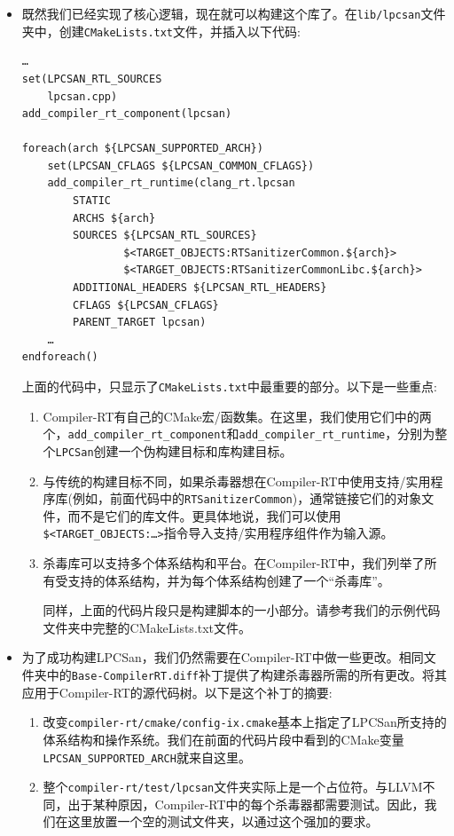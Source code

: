 \begin{itemize}
\item 既然我们已经实现了核心逻辑，现在就可以构建这个库了。在\texttt{lib/lpcsan}文件夹中，创建\texttt{CMakeLists.txt}文件，并插入以下代码:

\begin{lstlisting}[style=styleCMake]
…
set(LPCSAN_RTL_SOURCES
	lpcsan.cpp)
add_compiler_rt_component(lpcsan)

foreach(arch ${LPCSAN_SUPPORTED_ARCH})
	set(LPCSAN_CFLAGS ${LPCSAN_COMMON_CFLAGS})
	add_compiler_rt_runtime(clang_rt.lpcsan
		STATIC
		ARCHS ${arch}
		SOURCES ${LPCSAN_RTL_SOURCES}
				$<TARGET_OBJECTS:RTSanitizerCommon.${arch}>
				$<TARGET_OBJECTS:RTSanitizerCommonLibc.${arch}>
		ADDITIONAL_HEADERS ${LPCSAN_RTL_HEADERS}
		CFLAGS ${LPCSAN_CFLAGS}
		PARENT_TARGET lpcsan)
	…
endforeach()
\end{lstlisting}

上面的代码中，只显示了\texttt{CMakeLists.txt}中最重要的部分。以下是一些重点:


\begin{enumerate}[label=\roman*.]
\item Compiler-RT有自己的CMake宏/函数集。在这里，我们使用它们中的两个，\texttt{add\_compiler\_rt\_component}和\texttt{add\_compiler\_rt\_runtime}，分别为整个\texttt{LPCSan}创建一个伪构建目标和库构建目标。

\item 与传统的构建目标不同，如果杀毒器想在Compiler-RT中使用支持/实用程序库(例如，前面代码中的\texttt{RTSanitizerCommon})，通常链接它们的对象文件，而不是它们的库文件。更具体地说，我们可以使用\texttt{\$<TARGET\_OBJECTS:…>}指令导入支持/实用程序组件作为输入源。

\item 杀毒库可以支持多个体系结构和平台。在Compiler-RT中，我们列举了所有受支持的体系结构，并为每个体系结构创建了一个“杀毒库”。

同样，上面的代码片段只是构建脚本的一小部分。请参考我们的示例代码文件夹中完整的CMakeLists.txt文件。
\end{enumerate}

\item 为了成功构建LPCSan，我们仍然需要在Compiler-RT中做一些更改。相同文件夹中的\texttt{Base-CompilerRT.diff}补丁提供了构建杀毒器所需的所有更改。将其应用于Compiler-RT的源代码树。以下是这个补丁的摘要:

\begin{enumerate}[label=\roman*.]
\item 改变\texttt{compiler-rt/cmake/config-ix.cmake}基本上指定了LPCSan所支持的体系结构和操作系统。我们在前面的代码片段中看到的CMake变量\texttt{LPCSAN\_SUPPORTED\_ARCH}就来自这里。

\item 整个\texttt{compiler-rt/test/lpcsan}文件夹实际上是一个占位符。与LLVM不同，出于某种原因，Compiler-RT中的每个杀毒器都需要测试。因此，我们在这里放置一个空的测试文件夹，以通过这个强加的要求。
\end{enumerate}

\end{itemize}

